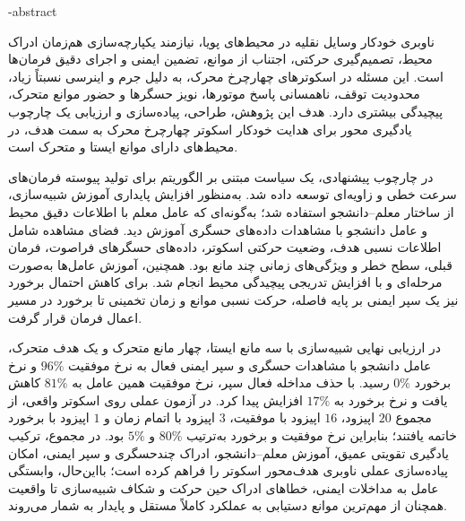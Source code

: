 \fa-abstract{
ناوبری خودکار وسایل نقلیه در محیط‌های پویا، نیازمند یکپارچه‌سازی هم‌زمان ادراک محیط، تصمیم‌گیری حرکتی، اجتناب از موانع، تضمین ایمنی و اجرای دقیق فرمان‌ها است. این مسئله در اسکوترهای چهارچرخ محرک، به دلیل جرم و اینرسی نسبتاً زیاد، محدودیت توقف، ناهمسانی پاسخ موتورها، نویز حسگرها و حضور موانع متحرک، پیچیدگی بیشتری دارد. هدف این پژوهش، طراحی، پیاده‌سازی و ارزیابی یک چارچوب یادگیری‌ محور برای هدایت خودکار اسکوتر چهارچرخ محرک به سمت هدف، در محیط‌های دارای موانع ایستا و متحرک است.

در چارچوب پیشنهادی، یک سیاست مبتنی بر الگوریتم  برای تولید پیوسته فرمان‌های سرعت خطی و زاویه‌ای توسعه داده شد. به‌منظور افزایش پایداری آموزش شبیه‌سازی، از ساختار معلم--دانشجو استفاده شد؛ به‌گونه‌ای که عامل معلم با اطلاعات دقیق محیط و عامل دانشجو با مشاهدات داده‌های حسگری آموزش دید. فضای مشاهده شامل اطلاعات نسبی هدف، وضعیت حرکتی اسکوتر، داده‌های حسگرهای فراصوت، فرمان قبلی، سطح خطر و ویژگی‌های زمانی چند مانع بود. همچنین، آموزش عامل‌ها به‌صورت مرحله‌ای و با افزایش تدریجی پیچیدگی محیط انجام شد. برای کاهش احتمال برخورد نیز یک سپر ایمنی بر پایه فاصله، حرکت نسبی موانع و زمان تخمینی تا برخورد در مسیر اعمال فرمان قرار گرفت.

در ارزیابی نهایی شبیه‌سازی با سه مانع ایستا، چهار مانع متحرک و یک هدف متحرک، عامل دانشجو با مشاهدات حسگری و سپر ایمنی فعال به نرخ موفقیت $96\%$ و نرخ برخورد $0\%$ رسید. با حذف مداخله فعال سپر، نرخ موفقیت همین عامل به $81\%$ کاهش یافت و نرخ برخورد به $17\%$ افزایش پیدا کرد. در آزمون عملی روی اسکوتر واقعی، از مجموع $20$ اپیزود، $16$ اپیزود با موفقیت، $3$ اپیزود با اتمام زمان و $1$ اپیزود با برخورد خاتمه یافتند؛ بنابراین نرخ موفقیت و برخورد به‌ترتیب $80\%$ و $5\%$ بود. در مجموع، ترکیب یادگیری تقویتی عمیق، آموزش معلم--دانشجو، ادراک چندحسگری و سپر ایمنی، امکان پیاده‌سازی عملی ناوبری هدف‌محور اسکوتر را فراهم کرده است؛ بااین‌حال، وابستگی عامل به مداخلات ایمنی، خطاهای ادراک حین حرکت و شکاف شبیه‌سازی تا واقعیت همچنان از مهم‌ترین موانع دستیابی به عملکرد کاملاً مستقل و پایدار به شمار می‌روند.

}

